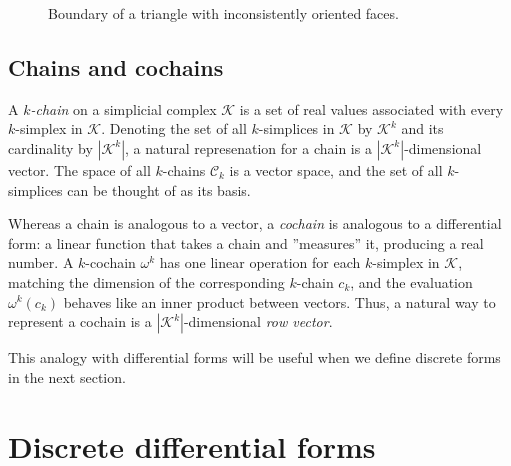 \documentclass[utf8,english]{gradu3}
\begin{document}
\begin{figure}[h]
  \centering
  \caption{
    \label{triangle_boundary}
    Boundary of a triangle with inconsistently oriented faces.
  }
\end{figure}


\subsection{Chains and cochains}\label{chains}

A \textit{$k$-chain} on a simplicial complex $\mathcal{K}$
is a set of real values associated with every $k$-simplex in $\mathcal{K}$.
Denoting the set of all $k$-simplices in $\mathcal{K}$ by $\mathcal{K}^k$
and its cardinality by $|\mathcal{K}^k|$,
a natural represenation for a chain is a $|\mathcal{K}^k|$-dimensional vector.
The space of all $k$-chains $\mathcal{C}_k$ is a vector space,
and the set of all $k$-simplices can be thought of as its basis.

Whereas a chain is analogous to a vector,
a \textit{cochain} is analogous to a differential form:
a linear function that takes a chain and ''measures'' it,
producing a real number.
A $k$-cochain $\omega^k$ has one linear operation for each $k$-simplex in $\mathcal{K}$,
matching the dimension of the corresponding $k$-chain $c_k$,
and the evaluation $\omega^k(c_k)$ behaves like an inner product between vectors.
Thus, a natural way to represent a cochain is a $|\mathcal{K}^k|$-dimensional \textit{row vector}.

This analogy with differential forms will be useful
when we define discrete forms in the next section.


\section{Discrete differential forms}
\end{document}
